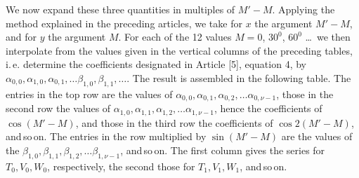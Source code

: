 \begin{landscape}
\begingroup
\fontsize{10}{13}\selectfont
{}
\renewcommand{\headrulewidth}{0pt}
We now expand these three quantities in multiples of \(M'-M\). Applying
the method explained in the preceding articles, we take for \(x\) the argument \(M'-M\), and for \(y\)
the argument \(M\). For each of the 12 values \(M=0\), \(30^0\), \(60^0\) \dots\ we then
interpolate from the values given in the vertical columns of the preceding tables,
i.\,e. determine the coefficients designated in Article [5], equation 4, by \(\alpha_{0,0}, \alpha_{1,0}, \alpha_{0,1},
\dots \beta_{1,0}, \beta_{1,1}, \dots\). The result
is assembled in the following table. The entries in the top row
are the values of \(\alpha_{0,0}, \alpha_{0,1}, \alpha_{0,2}, \dots \alpha_{0,\nu-1}\),
those in the second row the values of \(\alpha_{1,0}, \alpha_{1,1}, \alpha_{1,2}, \dots
\alpha_{1,\nu-1}\), hence the coefficients of \(\cos(M'-M)\), and those in the third row the
coefficients of \(\cos 2(M'-M)\), and\,so\,on. The entries in the row multiplied by \(\sin(M'-M)\)
are the values of the \(\beta_{1,0}, \beta_{1,1}, \beta_{1,2}, \dots
\beta_{1,\nu-1}\), and\,so\,on. The first column gives the series for \(T_0, V_0, W_0\), respectively,
the second those for \(T_1, V_1, W_1\), and\,so\,on.


\end{landscape}
